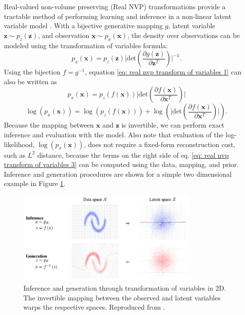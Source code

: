 Real-valued non-volume preserving (Real NVP) transformations provide a tractable method of performing learning and inference in a non-linear latent variable model \cite{dinh2016density}. With a bijective generative mapping $g$, latent variable $\mathbf{z} \sim p_z (\mathbf{z})$, and observation $\mathbf{x} \sim p_x (\mathbf{x})$, the density over observations can be modeled using the transformation of variables formula:
\begin{equation}
	p_x (\mathbf{x}) = p_z (\mathbf{z}) \bigg \vert \text{det} \left( \frac{\partial g(\mathbf{z})}{\partial \mathbf{z}^T} \right) \bigg \vert^{-1}.
	\label{eq: real nvp transform of variables 1}
\end{equation}
Using the bijection $f = g^{-1}$, equation \ref{eq: real nvp transform of variables 1} can also be written as
\begin{equation}
	p_x (\mathbf{x}) = p_z (f(\mathbf{x})) \bigg \vert \text{det} \left( \frac{\partial f(\mathbf{x})}{\partial \mathbf{x}^T} \right) \bigg \vert 
	\label{eq: real nvp transform of variables 2}
\end{equation}
\begin{equation}
	\log \left( p_x (\mathbf{x}) \right) = \log \left( p_z (f(\mathbf{x})) \right)  + \log \left( \bigg \vert \text{det} \left( \frac{\partial f(\mathbf{x})}{\partial \mathbf{x}^T} \right) \bigg \vert \right).
	\label{eq: real nvp transform of variables 3}
\end{equation}
Because the mapping between $\mathbf{x}$ and $\mathbf{z}$ is invertible, we can perform exact inference and evaluation with the model. Also note that evaluation of the log-likelihood, $\log \left( p_x (\mathbf{x}) \right)$, does not require a fixed-form reconstruction cost, such as $L^2$ distance, because the terms on the right side of eq. \ref{eq: real nvp transform of variables 3} can be computed using the data, mapping, and prior. Inference and generation procedures are shown for a simple two dimensional example in Figure \ref{fig: transform of variables}.
\begin{figure}[h]
    \centering
    \includegraphics[width=0.8\textwidth]{images/graphical_models/transform_of_variables.png}
    \caption{Inference and generation through transformation of variables in 2D. The invertible mapping between the observed and latent variables warps the respective spaces. Reproduced from \cite{dinh2016density}.}
    \label{fig: transform of variables}
\end{figure}

